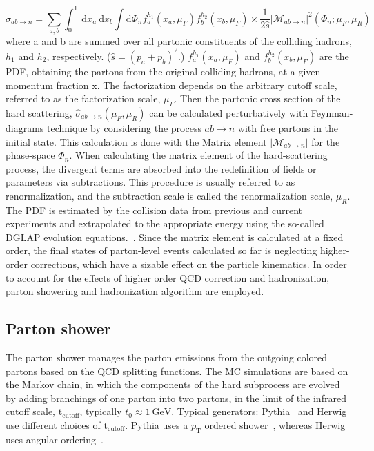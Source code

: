 \begin{equation}
\label{eqn:qcdxsec}
\sigma_{a b \rightarrow n}=\sum_{a, b} \int_{0}^{1} \mathrm{~d} x_{a} \mathrm{~d} x_{b} \int \mathrm{d} \Phi_{n} f_{a}^{h_{1}}\left(x_{a}, \mu_{F}\right) f_{b}^{h_{2}}\left(x_{b}, \mu_{F}\right) \times \frac{1}{2 \hat{s}}\left|\mathcal{M}_{a b \rightarrow n}\right|^{2}\left(\Phi_{n} ; \mu_{F}, \mu_{R}\right)
\end{equation}
where a and b are summed over all partonic constituents of the colliding hadrons, $h_1$ and $h_2$, respectively. ($\hat{s} = (p_a + p_b)^2$.)
$f_{a}^{h_{1}}\left(x_{a}, \mu_{F}\right)$ and $f_{b}^{h_{2}}\left(x_{b}, \mu_{F}\right)$ are the PDF, obtaining the partons from the original colliding hadrons, at a given momentum fraction x. The factorization depends on the arbitrary cutoff scale, referred to as the factorization scale, $\mu_F$.
Then the partonic cross section of the hard scattering, $\hat{\sigma}_{a b \rightarrow n}\left(\mu_{F}, \mu_{R}\right)$ can be calculated perturbatively with Feynman-diagrams technique by considering the process $ab\rightarrow n $ with free partons in the initial state. This calculation is done with the Matrix element $\left|\mathcal{M}_{a b \rightarrow n}\right|$ for the phase-space $\Phi_n$.
When calculating the matrix element of the hard-scattering process, the divergent terms are absorbed into the redefinition of fields or parameters via subtractions. This procedure is usually referred to as renormalization, and the subtraction scale is called the renormalization scale, $\mu_R$. 
The PDF is estimated by the collision data from previous and current experiments and extrapolated to the appropriate energy using the so-called DGLAP evolution equations.~\cite{https://doi.org/10.48550/arxiv.0802.0161}.
Since the matrix element is calculated at a fixed order, the final states of parton-level events calculated so far is neglecting higher-order corrections, which have a sizable effect on the particle kinematics. In order to account for the effects of higher order QCD correction and hadronization, parton showering and hadronization algorithm are employed.

\subsection{Parton shower}
\label{subsec:partonshower}
The parton shower manages the parton emissions from the outgoing colored partons based on the QCD splitting functions. 
The MC simulations are based on the Markov chain, in which the components of the hard subprocess are evolved by adding branchings of one parton into two partons, in the limit of the infrared cutoff scale, t$_{\mathrm{cutoff}}$, typically $t_{0} \approx 1~\mathrm{GeV}$. 
Typical generators: Pythia~\cite{SJOSTRAND2008852} and Herwig~\cite{Gieseke2012} use different choices of t$_{\mathrm{cutoff}}$.
Pythia uses a $p_\mathrm{T}$ ordered shower~\cite{PYTHIAorder}, whereas Herwig uses angular ordering~\cite{PhysRevD.76.094003}.
